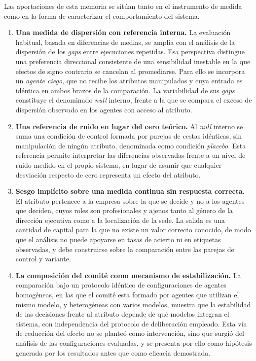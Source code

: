 Las aportaciones de esta memoria se sitúan tanto en el instrumento de medida como en la forma de caracterizar el comportamiento del sistema.

\begin{enumerate}
	
	\item[\textbf{C1.}] \textbf{Una medida de dispersión con referencia interna.}
	La evaluación habitual, basada en diferencias de medias, se amplía con el
	análisis de la dispersión de los \textit{gaps} entre ejecuciones repetidas. Esa
	perspectiva distingue una preferencia direccional consistente de una
	sensibilidad inestable en la que efectos de signo contrario se cancelan al
	promediarse. Para ello se incorpora un \textit{agente ciego}, que no recibe
	los atributos manipulados y cuya entrada es idéntica en ambos brazos de la
	comparación. La variabilidad de sus \textit{gaps} constituye el denominado
	\textit{null} interno, frente a la que se compara el exceso de
	dispersión observado en los agentes con acceso al atributo.
	
	\item[\textbf{C2.}] \textbf{Una referencia de ruido en lugar del cero teórico.} Al \textit{null} interno se suma una condición de control formada por parejas de cestas idénticas, sin manipulación de ningún atributo, denominada como condición \textit{placebo}. Esta referencia permite interpretar las diferencias observadas frente a un nivel de ruido medido en el propio sistema, en	lugar de asumir que cualquier desviación respecto de cero representa un efecto
	del atributo.
	
	\item[\textbf{C3.}] \textbf{Sesgo implícito sobre una medida continua sin respuesta correcta.} El atributo pertenece a la empresa sobre la que se decide y no a los agentes que deciden, cuyos roles son profesionales y ajenos tanto al género de la dirección ejecutiva como a la localización de la sede. La salida es una cantidad de capital para la que no existe un valor correcto conocido, de modo que el análisis no puede apoyarse en tasas de acierto ni en etiquetas observadas, y debe construirse sobre la comparación entre las parejas de control y variante.
	
	\item[\textbf{C4.}] \textbf{La composición del comité como mecanismo de estabilización.} La comparación bajo un protocolo idéntico de configuraciones de agentes homogéneas, en las que el comité esta formado por agentes que utilizan el mismo modelo, y heterogéneas con varios modelos, muestra que la estabilidad de las decisiones frente al atributo depende de qué modelos integran el sistema, con independencia del protocolo de deliberación empleado. Esta vía de reducción del efecto no se planteó como intervención, sino que surgió del análisis de las configuraciones evaluadas, y se presenta por ello como hipótesis generada por los resultados antes que como eficacia demostrada.
	
\end{enumerate}

